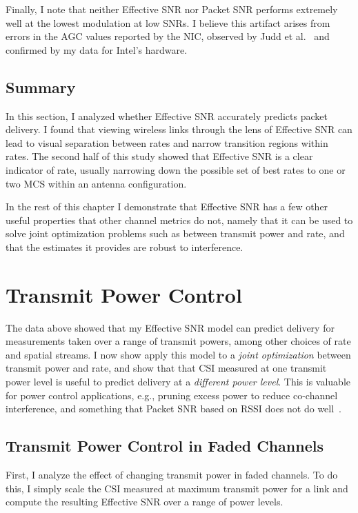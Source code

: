 Finally, I note that neither Effective SNR nor Packet SNR performs extremely well at the lowest modulation at low SNRs. I believe this artifact arises from errors in the AGC values reported by the NIC, observed by Judd et al.~\cite{Judd_CHARM} and confirmed by my data for Intel's hardware.

\subsection{Summary}
In this section, I analyzed whether Effective SNR accurately predicts packet delivery. I found that viewing wireless links through the lens of Effective SNR can lead to visual separation between rates and narrow transition regions within rates. The second half of this study showed that Effective SNR is a clear indicator of rate, usually narrowing down the possible set of best rates to one or two MCS within an antenna configuration.

In the rest of this chapter I demonstrate that Effective SNR has a few other useful properties that other channel metrics do not, namely that it can be used to solve joint optimization problems such as between transmit power and rate, and that the estimates it provides are robust to interference.

\section{Transmit Power Control}
\label{sec:tx_power_trim}
The data above showed that my Effective SNR model can predict delivery for measurements taken over a range of transmit powers, among other choices of rate and spatial streams. I now show apply this model to a \emph{joint optimization} between transmit power and rate, and show that that CSI measured at one transmit power level is useful to predict delivery at a \emph{different power level}. This is valuable for power control applications, e.g., pruning excess power to reduce co-channel interference, and something that Packet SNR based on RSSI does not do well~\cite{Monks_PowerMAC,Ramachandran_Symphony,Son_PowerStudy}. 

\subsection{Transmit Power Control in Faded Channels}
First, I analyze the effect of changing transmit power in faded channels. To do this, I simply scale the CSI measured at maximum transmit power for a link and compute the resulting Effective SNR over a range of power levels.

